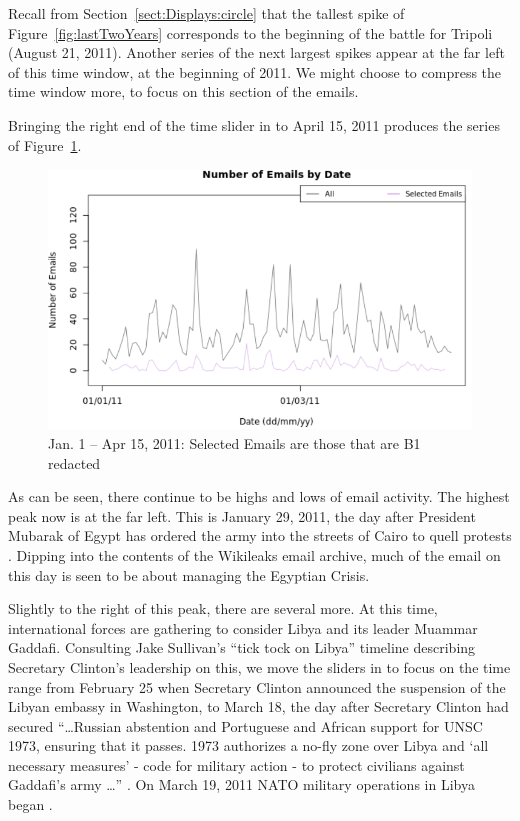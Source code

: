 \documentclass[journal]{vgtc}                %
\begin{document}
Recall from Section~\ref{sect:Displays:circle} that the tallest spike of Figure~\ref{fig:lastTwoYears} corresponds to the beginning of the battle for Tripoli (August 21, 2011).   Another series of the next largest spikes appear at the far left of this time window, at the beginning of 2011.  We might choose to compress the time window more, to focus on this section of the emails.

Bringing the right end of the time slider in to April 15, 2011 produces the series of Figure~\ref{fig:early2011B1}.
\begin{figure}[h]
\begin{center}
\includegraphics[width=0.95\linewidth]{EmailVolumeB1JanApril2011}
\caption{Jan. 1 -- Apr 15, 2011:  Selected Emails are those that are B1 redacted}
\label{fig:early2011B1}
\end{center}
\end{figure}
As can be seen, there continue to be highs and lows of email activity.   The highest peak now is at the far left.  This is January 29, 2011, the day after President Mubarak of Egypt has ordered the army into the streets of Cairo to quell protests \cite{cairoTanks2011, cairoResponse2011}.  Dipping into the contents of the Wikileaks email archive, much of the email on this day is seen to be about managing the Egyptian Crisis.  

Slightly to the right of this peak, there are several more.   At this time, international forces are gathering to consider Libya and its leader Muammar Gaddafi.  Consulting Jake Sullivan's ``tick tock on Libya'' timeline describing Secretary Clinton's leadership on this, we move the sliders in to focus on the time range from February 25 when Secretary Clinton announced the suspension of the Libyan embassy in Washington, to March 18, the day after Secretary Clinton had secured ``\ldots Russian abstention and Portuguese and African support for UNSC 1973, ensuring that  it passes. 1973 authorizes a no-fly zone over Libya and `all necessary measures' - code for military action - to protect civilians against Gaddafi's army \ldots'' \cite{tickTockLibya}.  On March 19, 2011 NATO military operations in Libya began \cite{LibyaTimelineWiki}.
\end{document}
